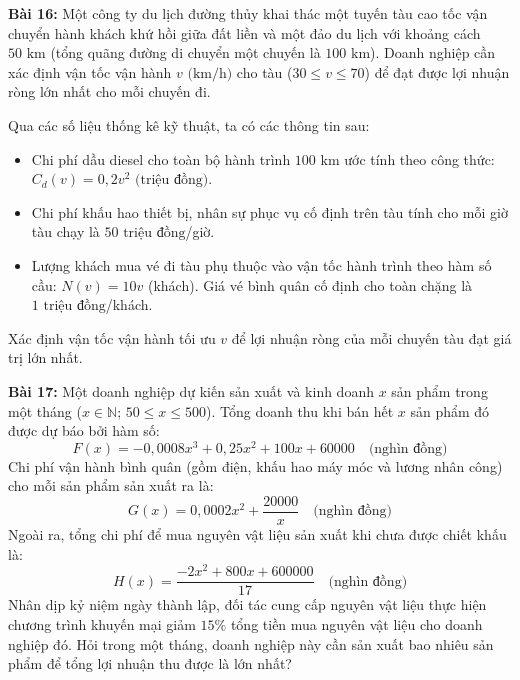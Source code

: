 \documentclass[12pt]{article}
\begin{document}
	\vspace{0.6cm}
	
	\noindent \textbf{Bài 16:} Một công ty du lịch đường thủy khai thác một tuyến tàu cao tốc vận chuyển hành khách khứ hồi giữa đất liền và một đảo du lịch với khoảng cách $50\text{ km}$ (tổng quãng đường di chuyển một chuyến là $100\text{ km}$). Doanh nghiệp cần xác định vận tốc vận hành $v\text{ (km/h)}$ cho tàu ($30 \le v \le 70$) để đạt được lợi nhuận ròng lớn nhất cho mỗi chuyến đi. 
	
	Qua các số liệu thống kê kỹ thuật, ta có các thông tin sau:
	\begin{itemize}
		\item Chi phí dầu diesel cho toàn bộ hành trình $100\text{ km}$ ước tính theo công thức: $C_d(v) = 0{,}2v^2\text{ (triệu đồng)}$.
		\item Chi phí khấu hao thiết bị, nhân sự phục vụ cố định trên tàu tính cho mỗi giờ tàu chạy là $50\text{ triệu đồng}$/giờ.
		\item Lượng khách mua vé đi tàu phụ thuộc vào vận tốc hành trình theo hàm số cầu: $N(v) = 10v$ (khách). Giá vé bình quân cố định cho toàn chặng là $1\text{ triệu đồng}$/khách.
	\end{itemize}
	Xác định vận tốc vận hành tối ưu $v$ để lợi nhuận ròng của mỗi chuyến tàu đạt giá trị lớn nhất.
	
	\vspace{0.6cm}
	\noindent \textbf{Bài 17:} Một doanh nghiệp dự kiến sản xuất và kinh doanh $x$ sản phẩm trong một tháng ($x \in \mathbb{N}; \, 50 \le x \le 500$). Tổng doanh thu khi bán hết $x$ sản phẩm đó được dự báo bởi hàm số:
	$$F(x) = -0{,}0008x^3 + 0{,}25x^2 + 100x + 60000 \quad \text{(nghìn đồng)}$$
	Chi phí vận hành bình quân (gồm điện, khấu hao máy móc và lương nhân công) cho mỗi sản phẩm sản xuất ra là:
	$$G(x) = 0{,}0002x^2 + \frac{20000}{x} \quad \text{(nghìn đồng)}$$
	Ngoài ra, tổng chi phí để mua nguyên vật liệu sản xuất khi chưa được chiết khấu là:
	$$H(x) = \frac{-2x^2 + 800x + 600000}{17} \quad \text{(nghìn đồng)}$$
	Nhân dịp kỷ niệm ngày thành lập, đối tác cung cấp nguyên vật liệu thực hiện chương trình khuyến mại giảm $15\%$ tổng tiền mua nguyên vật liệu cho doanh nghiệp đó. Hỏi trong một tháng, doanh nghiệp này cần sản xuất bao nhiêu sản phẩm để tổng lợi nhuận thu được là lớn nhất?
	\newpage
	
\end{document}

